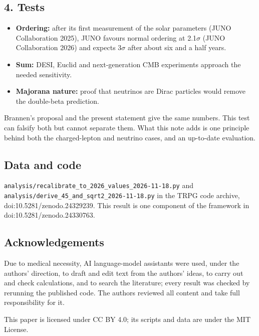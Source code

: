 \documentclass[
  11pt,
]{article}
\providecommand{\tightlist}{%
  \setlength{\itemsep}{0pt}\setlength{\parskip}{0pt}}
\begin{document}
\hypertarget{tests}{%
\subsection{4. Tests}\label{tests}}

\begin{itemize}
\tightlist
\item
  \textbf{Ordering:} after its first measurement of the solar parameters (JUNO Collaboration 2025), JUNO favours normal ordering at 2.1\ensuremath{\sigma} (JUNO Collaboration 2026) and expects 3\ensuremath{\sigma} after about six and a half years.
\item
  \textbf{Sum:} DESI, Euclid and next-generation CMB experiments approach the needed sensitivity.
\item
  \textbf{Majorana nature:} proof that neutrinos are Dirac particles would remove the double-beta prediction.
\end{itemize}

Brannen's proposal and the present statement give the same numbers. This test can falsify both but cannot separate them. What this note adds is one principle behind both the charged-lepton and neutrino cases, and an up-to-date evaluation.

\hypertarget{data-and-code}{%
\subsection{Data and code}\label{data-and-code}}

\texttt{analysis/recalibrate\_to\_2026\_values\_2026-11-18.py} and \texttt{analysis/derive\_45\_and\_sqrt2\_2026-11-18.py} in the TRPG code archive, doi:10.5281/zenodo.24329239. This result is one component of the framework in doi:10.5281/zenodo.24330763.

\hypertarget{acknowledgements}{%
\subsection{Acknowledgements}\label{acknowledgements}}

Due to medical necessity, AI language-model assistants were used, under the authors' direction, to draft and edit text from the authors' ideas, to carry out and check calculations, and to search the literature; every result was checked by rerunning the published code. The authors reviewed all content and take full responsibility for it.

This paper is licensed under CC BY 4.0; its scripts and data are under the MIT License.
\end{document}
